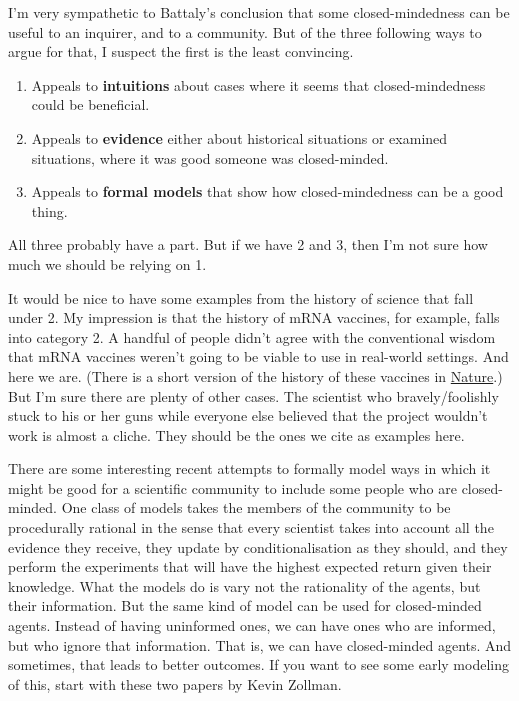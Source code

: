 \documentclass[
]{article}
\providecommand{\tightlist}{%
  \setlength{\itemsep}{0pt}\setlength{\parskip}{0pt}}
\begin{document}
I'm very sympathetic to Battaly's conclusion that some closed-mindedness
can be useful to an inquirer, and to a community. But of the three
following ways to argue for that, I suspect the first is the least
convincing.

\begin{enumerate}
\def\labelenumi{\arabic{enumi}.}
\tightlist
\item
  Appeals to \textbf{intuitions} about cases where it seems that
  closed-mindedness could be beneficial.
\item
  Appeals to \textbf{evidence} either about historical situations or
  examined situations, where it was good someone was closed-minded.
\item
  Appeals to \textbf{formal models} that show how closed-mindedness can
  be a good thing.
\end{enumerate}

All three probably have a part. But if we have 2 and 3, then I'm not
sure how much we should be relying on 1.

It would be nice to have some examples from the history of science that
fall under 2. My impression is that the history of mRNA vaccines, for
example, falls into category 2. A handful of people didn't agree with
the conventional wisdom that mRNA vaccines weren't going to be viable to
use in real-world settings. And here we are. (There is a short version
of the history of these vaccines in
\href{https://www.nature.com/articles/d41586-021-02483-w}{Nature}.) But
I'm sure there are plenty of other cases. The scientist who
bravely/foolishly stuck to his or her guns while everyone else believed
that the project wouldn't work is almost a cliche. They should be the
ones we cite as examples here.

There are some interesting recent attempts to formally model ways in
which it might be good for a scientific community to include some people
who are closed-minded. One class of models takes the members of the
community to be procedurally rational in the sense that every scientist
takes into account all the evidence they receive, they update by
conditionalisation as they should, and they perform the experiments that
will have the highest expected return given their knowledge. What the
models do is vary not the rationality of the agents, but their
information. But the same kind of model can be used for closed-minded
agents. Instead of having uninformed ones, we can have ones who are
informed, but who ignore that information. That is, we can have
closed-minded agents. And sometimes, that leads to better outcomes. If
you want to see some early modeling of this, start with these two papers
by Kevin Zollman.
\end{document}
